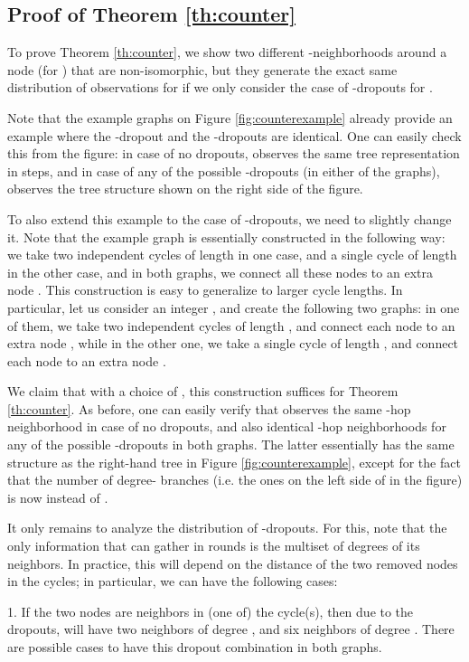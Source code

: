 \documentclass{article}
\begin{document}
\subsection{Proof of Theorem \ref{th:counter}}

To prove Theorem \ref{th:counter}, we show two different -neighborhoods around a node  (for ) that are non-isomorphic, but they generate the exact same distribution of observations for  if we only consider the case of -dropouts for . 

Note that the example graphs on Figure \ref{fig:counterexample} already provide an example where the -dropout and the -dropouts are identical. One can easily check this from the figure: in case of no dropouts,  observes the same tree representation in  steps, and in case of any of the  possible -dropouts (in either of the graphs),  observes the tree structure shown on the right side of the figure.  

To also extend this example to the case of -dropouts, we need to slightly change it. Note that the example graph is essentially constructed in the following way: we take two independent cycles of length  in one case, and a single cycle of length  in the other case, and in both graphs, we connect all these nodes to an extra node . This construction is easy to generalize to larger cycle lengths. In particular, let us consider an integer , and create the following two graphs: in one of them, we take two independent cycles of length , and connect each node to an extra node , while in the other one, we take a single cycle of length , and connect each node to an extra node .

We claim that with a choice of , this construction suffices for Theorem \ref{th:counter}. As before, one can easily verify that  observes the same -hop neighborhood in case of no dropouts, and also identical -hop neighborhoods for any of the  possible -dropouts in both graphs. The latter essentially has the same structure as the right-hand tree in Figure \ref{fig:counterexample}, except for the fact that the number of degree- branches (i.e. the ones on the left side of  in the figure) is now  instead of .

It only remains to analyze the distribution of -dropouts. For this, note that the only information that  can gather in  rounds is the multiset of degrees of its neighbors. In practice, this will depend on the distance of the two removed nodes in the cycles; in particular, we can have the following cases:

1. If the two nodes are neighbors in (one of) the cycle(s), then due to the dropouts,  will have two neighbors of degree , and six neighbors of degree . There are  possible cases to have this dropout combination in both graphs.
\end{document}
